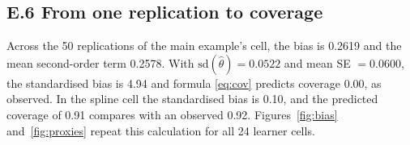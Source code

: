 \documentclass[11pt,a4paper]{article}
\begin{document}
\subsection*{E.6 From one replication to coverage}

Across the 50 replications of the main example's cell, the bias is 0.2619 and the mean second-order term 0.2578. With $\mathrm{sd}(\hat\theta)=0.0522$ and mean SE $=0.0600$, the standardised bias is 4.94 and formula \eqref{eq:cov} predicts coverage 0.00, as observed. In the spline cell the standardised bias is 0.10, and the predicted coverage of 0.91 compares with an observed 0.92. Figures~\ref{fig:bias} and~\ref{fig:proxies} repeat this calculation for all 24 learner cells.
\end{document}
